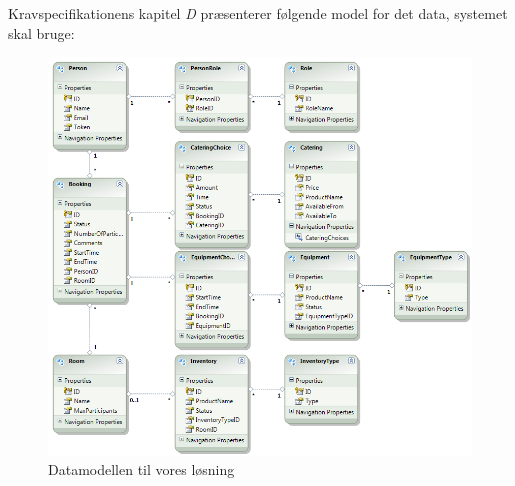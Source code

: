 Kravspecifikationens kapitel \textit{D} \cite[s.14]{kravspec} præsenterer følgende model for det data, systemet skal bruge:
\begin{figure}[h!]
  \centering
    \includegraphics[width=\textwidth]{Chapters/Design/Technical/Images/OurDataModel}
  \caption{Datamodellen til vores løsning}
\label{Fig:Technical_Database_our_datamodel}
\end{figure}